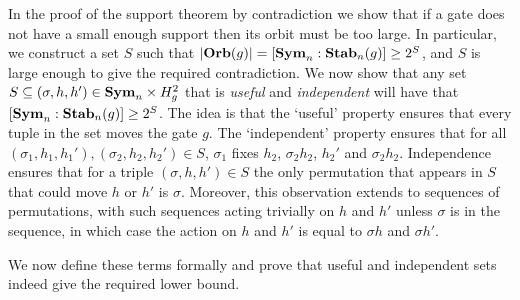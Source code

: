 \documentclass[../paper.tex]{subfiles}
\begin{document}



In the proof of the support theorem by contradiction we show that if a gate does
not have a small enough support then its orbit must be too large. In particular,
we construct a set $S$ such that $\vert \text{\textbf{Orb}}(g) \vert = [\text{\textbf{Sym}}_n : \text{\textbf{Stab}}_n(g)]
\geq 2^S$, and $S$ is large enough to give the required contradiction. We now
show that any set $S \subseteq (\sigma, h, h') \in \text{\textbf{Sym}}_n \times H^2_g$ that is
\emph{useful} and \emph{independent} will have that $[\text{\textbf{Sym}}_n : \text{\textbf{Stab}}_n(g)] \geq
2^S$. The idea is that the `useful' property ensures that every tuple in the set
moves the gate $g$. The `independent' property ensures that for all $(\sigma_1,
h_1, h_1'), (\sigma_2, h_2, h_2') \in S$, $\sigma_1$ fixes $h_2$, $\sigma_2
h_2$, $h_2'$ and $\sigma_2 h_2$. Independence ensures that for a triple
$(\sigma, h, h') \in S$ the only permutation that appears in $S$ that could move
$h$ or $h'$ is $\sigma$. Moreover, this observation extends to sequences of
permutations, with such sequences acting trivially on $h$ and $h'$ unless
$\sigma$ is in the sequence, in which case the action on $h$ and $h'$ is equal
to $\sigma h$ and $\sigma h'$.

We now define these terms formally and prove that useful and independent sets
indeed give the required lower bound.


  
\end{document}
